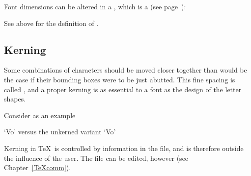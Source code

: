 \documentclass{book}
\begin{document}
Font dimensions can be altered in a , which is a  (see
page~\pageref{global:assign}):
\begin{Disp}
\end{Disp} See above for the definition of .

\subsection{Kerning}

Some combinations of characters should be moved closer
together than would be the case if their bounding boxes
were to be just abutted. This fine spacing is called ,
and a proper kerning is as essential to a font as the
design of the letter shapes.

Consider as an example
\begin{Disp} `Vo' versus the unkerned variant `V\hbox{}o'\end{Disp}

Kerning in \TeX\ is controlled by information in the
 file, and is therefore outside the influence of the
user. The  file can be edited, however (see Chapter~\ref{TeXcomm}).
\end{document}
